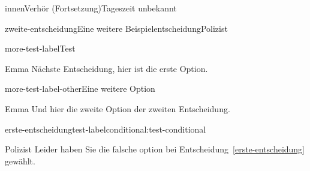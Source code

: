 \documentclass[12pt]{article}
\begin{document}
\begin{scene}{innen}{Verhör (Fortsetzung)}{Tageszeit unbekannt}
        \begin{decision}{zweite-entscheidung}{Eine weitere Beispielentscheidung}{Polizist}
            \begin{option}{more-test-label}{Test}
                \begin{dialog}{Emma}
                    Nächste Entscheidung, hier ist die erste Option.
                \end{dialog}
            \end{option}
            \begin{option}{more-test-label-other}{Eine weitere Option}
                \begin{dialog}{Emma}
                    Und hier die zweite Option der zweiten Entscheidung.
                \end{dialog}
            \end{option}
        \end{decision}

        \begin{conditional}{erste-entscheidung}{test-label}{conditional:test-conditional}
            \begin{dialog}{Polizist}
                Leider haben Sie die falsche option bei Entscheidung~\ref{erste-entscheidung} gewählt.
            \end{dialog}
        \end{conditional}

    \end{scene}
\end{document}
